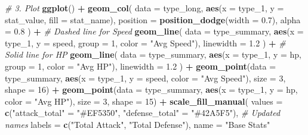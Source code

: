 \documentclass[
]{article}
\newenvironment{Shaded}{\begin{snugshade}}{\end{snugshade}}
\newcommand{\AttributeTok}[1]{\textcolor[rgb]{0.13,0.29,0.53}{#1}}
\newcommand{\CommentTok}[1]{\textcolor[rgb]{0.56,0.35,0.01}{\textit{#1}}}
\newcommand{\DecValTok}[1]{\textcolor[rgb]{0.00,0.00,0.81}{#1}}
\newcommand{\FloatTok}[1]{\textcolor[rgb]{0.00,0.00,0.81}{#1}}
\newcommand{\FunctionTok}[1]{\textcolor[rgb]{0.13,0.29,0.53}{\textbf{#1}}}
\newcommand{\NormalTok}[1]{#1}
\newcommand{\OtherTok}[1]{\textcolor[rgb]{0.56,0.35,0.01}{#1}}
\newcommand{\SpecialCharTok}[1]{\textcolor[rgb]{0.81,0.36,0.00}{\textbf{#1}}}
\newcommand{\StringTok}[1]{\textcolor[rgb]{0.31,0.60,0.02}{#1}}
\begin{document}
\begin{Shaded}
\begin{Highlighting}[]
\CommentTok{\# 3. Plot}
\FunctionTok{ggplot}\NormalTok{() }\SpecialCharTok{+}
  \FunctionTok{geom\_col}\NormalTok{(}
    \AttributeTok{data =}\NormalTok{ type\_long,}
    \FunctionTok{aes}\NormalTok{(}\AttributeTok{x =}\NormalTok{ type\_1, }\AttributeTok{y =}\NormalTok{ stat\_value, }\AttributeTok{fill =}\NormalTok{ stat\_name),}
    \AttributeTok{position =} \FunctionTok{position\_dodge}\NormalTok{(}\AttributeTok{width =} \FloatTok{0.7}\NormalTok{), }\AttributeTok{alpha =} \FloatTok{0.8}
\NormalTok{  ) }\SpecialCharTok{+}
  \CommentTok{\# Dashed line for Speed}
  \FunctionTok{geom\_line}\NormalTok{(}
    \AttributeTok{data =}\NormalTok{ type\_summary,}
    \FunctionTok{aes}\NormalTok{(}\AttributeTok{x =}\NormalTok{ type\_1, }\AttributeTok{y =}\NormalTok{ speed, }\AttributeTok{group =} \DecValTok{1}\NormalTok{, }\AttributeTok{color =} \StringTok{"Avg Speed"}\NormalTok{),}
    \AttributeTok{linewidth =} \FloatTok{1.2}
\NormalTok{  ) }\SpecialCharTok{+}
  \CommentTok{\# Solid line for HP}
  \FunctionTok{geom\_line}\NormalTok{(}
    \AttributeTok{data =}\NormalTok{ type\_summary,}
    \FunctionTok{aes}\NormalTok{(}\AttributeTok{x =}\NormalTok{ type\_1, }\AttributeTok{y =}\NormalTok{ hp, }\AttributeTok{group =} \DecValTok{1}\NormalTok{, }\AttributeTok{color =} \StringTok{"Avg HP"}\NormalTok{),}
    \AttributeTok{linewidth =} \FloatTok{1.2}
\NormalTok{  ) }\SpecialCharTok{+}
  \FunctionTok{geom\_point}\NormalTok{(}\AttributeTok{data =}\NormalTok{ type\_summary, }\FunctionTok{aes}\NormalTok{(}\AttributeTok{x =}\NormalTok{ type\_1, }\AttributeTok{y =}\NormalTok{ speed, }\AttributeTok{color =} \StringTok{"Avg Speed"}\NormalTok{), }\AttributeTok{size =} \DecValTok{3}\NormalTok{, }\AttributeTok{shape =} \DecValTok{16}\NormalTok{) }\SpecialCharTok{+}
  \FunctionTok{geom\_point}\NormalTok{(}\AttributeTok{data =}\NormalTok{ type\_summary, }\FunctionTok{aes}\NormalTok{(}\AttributeTok{x =}\NormalTok{ type\_1, }\AttributeTok{y =}\NormalTok{ hp, }\AttributeTok{color =} \StringTok{"Avg HP"}\NormalTok{), }\AttributeTok{size =} \DecValTok{3}\NormalTok{, }\AttributeTok{shape =} \DecValTok{15}\NormalTok{) }\SpecialCharTok{+}
  \FunctionTok{scale\_fill\_manual}\NormalTok{(}
    \AttributeTok{values =} \FunctionTok{c}\NormalTok{(}\StringTok{"attack\_total"} \OtherTok{=} \StringTok{"\#EF5350"}\NormalTok{, }\StringTok{"defense\_total"} \OtherTok{=} \StringTok{"\#42A5F5"}\NormalTok{), }\CommentTok{\# Updated names}
    \AttributeTok{labels =} \FunctionTok{c}\NormalTok{(}\StringTok{"Total Attack"}\NormalTok{, }\StringTok{"Total Defense"}\NormalTok{), }
    \AttributeTok{name =} \StringTok{"Base Stats"}

\end{Highlighting}
\end{Shaded}
\end{document}
